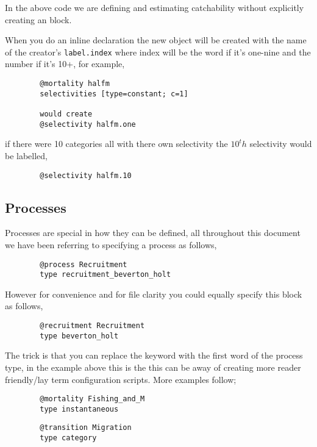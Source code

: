 In the above code we are defining and estimating catchability without explicitly creating an  block.

When you do an inline declaration the new object will be created with the name of the creator's \texttt{label.index} where index will be the word if it's one-nine and the number if it's 10+, for example,
{\small{\begin{verbatim}
		@mortality halfm
		selectivities [type=constant; c=1]
		
		would create
		@selectivity halfm.one
		\end{verbatim}}}

if there were 10 categories all with there own selectivity the $10^th$ selectivity would be labelled,

{\small{\begin{verbatim}
		@selectivity halfm.10
		\end{verbatim}}}


\subsection{Processes}
Processes are special in how they can be defined, all throughout this document we have been referring to specifying a process as follows,

{\small{\begin{verbatim}
		@process Recruitment
		type recruitment_beverton_holt
		\end{verbatim}}}
However for convenience and for file clarity you could equally specify this block as follows,
{\small{\begin{verbatim}
		@recruitment Recruitment
		type beverton_holt
		\end{verbatim}}}

The trick is that you can replace the keyword  with the first word of the process type, in the example above this is the  this can be away of creating more reader friendly/lay term configuration scripts. More examples follow;

{\small{\begin{verbatim}
		@mortality Fishing_and_M
		type instantaneous
		\end{verbatim}}}

{\small{\begin{verbatim}
		@transition Migration
		type category
		\end{verbatim}}}
	
\subsection{\label{example1}}

